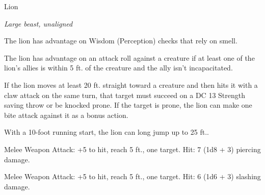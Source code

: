 \begin{monsterbox}{Lion}
\begin{hangingpar}
\textit{Large beast, unaligned}
\end{hangingpar}
\dndline%
\basics[%
armorclass = 12,
hitpoints = 4d10 + 4,
speed = {50 ft.}
]
\dndline%
\stats[%
STR = \stat{17},
DEX = \stat{15},
CON = \stat{13},
INT = \stat{3},
WIS = \stat{12},
CHA = \stat{8}
]
\dndline%
\details[%
skills={Stealth +6, Perception +3, },
damageimmunities={},
savingthrows={},
conditionimmunities={},
damageresistances={},
damagevulnerabilities={},
senses={passive Perception 13},
challenge=1
]
\dndline%
\begin{monsteraction}
The lion has advantage on Wisdom (Perception) checks that rely on smell.
\end{monsteraction}
\begin{monsteraction}
The lion has advantage on an attack roll against a creature if at least one of the lion's allies is within 5 ft. of the creature and the ally isn't incapacitated.
\end{monsteraction}
\begin{monsteraction}[Pounce]
If the lion moves at least 20 ft. straight toward a creature and then hits it with a claw attack on the same turn, that target must succeed on a DC 13 Strength saving throw or be knocked prone. If the target is prone, the lion can make one bite attack against it as a bonus action.
\end{monsteraction}
\begin{monsteraction}
With a 10-foot running start, the lion can long jump up to 25 ft..
\end{monsteraction}
\begin{monsteraction}[Bite]
Melee Weapon Attack: +5 to hit, reach 5 ft., one target. Hit: 7 (1d8 + 3) piercing damage.
\end{monsteraction}
\begin{monsteraction}[Claw]
Melee Weapon Attack: +5 to hit, reach 5 ft., one target. Hit: 6 (1d6 + 3) slashing damage.
\end{monsteraction}
\end{monsterbox}